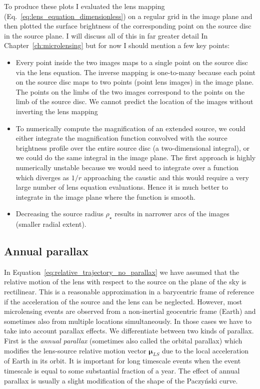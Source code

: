 \documentclass[12pt,dvipsnames]{report}
\begin{document}
To produce these plots I evaluated the lens mapping
(Eq.~\ref{eq:lens_equation_dimensionless}) on a regular grid in the image plane
and then plotted the surface brightness of the corresponding point on the
source disc in the source plane. I will discuss all of this in far greater
detail In Chapter~\ref{ch:microlensing} but for now I should mention a few key
points:
\begin{itemize}
    \item Every point inside the two images maps to a single point on the source disc via
          the lens equation. The inverse mapping is one-to-many because each point on the
          source disc maps to two points (point lens images) in the image plane. The
          points on the limbs of the two images correspond to the points on the limb of
          the source disc. We cannot predict the location of the images without inverting
          the lens mapping
    \item To numerically compute the magnification of an extended source, we could either
          integrate the magnification function convolved with the source brightness
          profile over the entire source disc (a two-dimensional integral), or we could
          do the same integral in the image plane. The first approach is highly
          numerically unstable because we would need to integrate over a function which
          diverges as $1/r$ approaching the caustic and this would require a very large
          number of lens equation evaluations. Hence it is much better to integrate in
          the image plane where the function is smooth.
    \item Decreasing the source radius $\rho_\star$ results in narrower arcs of the
          images (smaller radial extent).
\end{itemize}

\subsection{Annual parallax}
\label{ssec:single_lens_parallax}
In Equation~\ref{eq:relative_trajectory_no_parallax} we have assumed that the
relative motion of the lens with respect to the source on the plane of the sky
is rectilinear.
This is a reasonable approximation in a barycentric frame of
reference if the acceleration of the source and the lens can be neglected.
However, most microlensing events are observed from a non-inertial geocentric
frame (Earth) and sometimes also from multiple locations simultaneously. In those
cases we have to take into account parallax effects.
We differentiate between two kinds of parallax. First is the \emph{annual
    parallax} (sometimes also called the orbital parallax) which modifies the
lens-source relative motion vector $\boldsymbol\mu_{LS}$ due to the local
acceleration of Earth in its orbit. It is important for long timescale events
when the event timescale is equal to some substantial fraction of a year. The
effect of annual parallax is usually a slight modification of the shape of the
Paczy\'nski curve.
\end{document}
